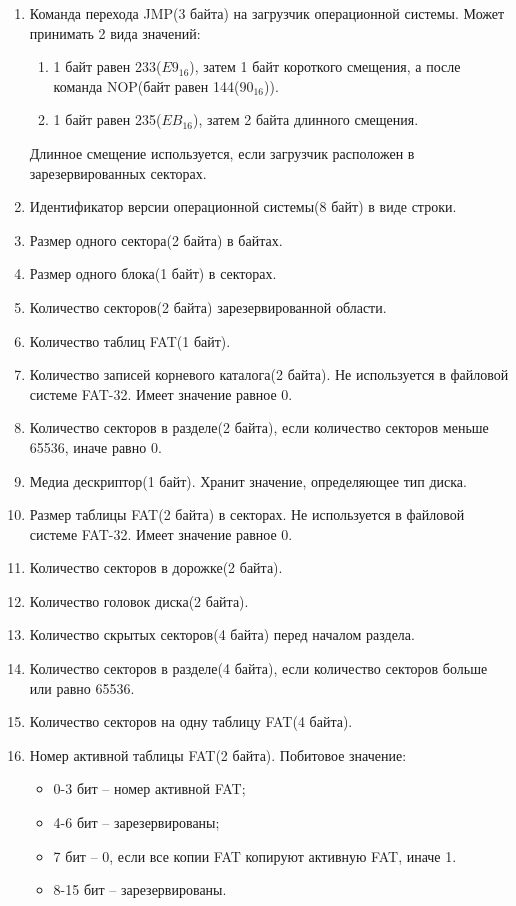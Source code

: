 \begin{enumerate}
\item Команда перехода JMP(3 байта) на загрузчик операционной системы. Может принимать 2 вида значений:

	\begin{enumerate}
	\item 1 байт равен 233($E9_{16}$), затем 1 байт короткого смещения, а после команда NOP(байт равен 144($90_{16}$)).
	\item 1 байт равен 235($EB_{16}$), затем 2 байта длинного смещения.
	\end{enumerate}
	
Длинное смещение используется, если загрузчик расположен в зарезервированных секторах.
\item Идентификатор версии операционной системы(8 байт) в виде строки.
\item Размер одного сектора(2 байта) в байтах.
\item Размер одного блока(1 байт) в секторах.
\item Количество секторов(2 байта) зарезервированной области.
\item Количество таблиц FAT(1 байт).
\item Количество записей корневого каталога(2 байта). Не используется в файловой системе FAT-32. Имеет значение равное 0.
\item Количество секторов в разделе(2 байта), если количество секторов меньше 65536, иначе равно 0.
\item Медиа дескриптор(1 байт). Хранит значение, определяющее тип диска.
\item Размер таблицы FAT(2 байта) в секторах. Не используется в файловой системе FAT-32. Имеет значение равное 0.
\item Количество секторов в дорожке(2 байта).
\item Количество головок диска(2 байта).
\item Количество скрытых секторов(4 байта) перед началом раздела.
\item Количество секторов в разделе(4 байта), если количество секторов больше или равно 65536.
\item Количество секторов на одну таблицу FAT(4 байта).
\item Номер активной таблицы FAT(2 байта). Побитовое значение:

	\begin{itemize}
	\item 0-3 бит -- номер активной FAT;
	\item 4-6 бит -- зарезервированы;
	\item 7 бит -- 0, если все копии FAT копируют активную FAT, иначе 1.
	\item 8-15 бит -- зарезервированы.
	\end{itemize}
	

\end{enumerate}
